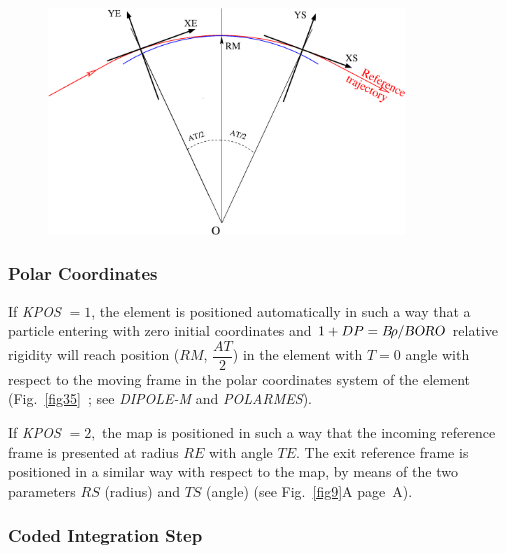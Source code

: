 \begin{figure}[h]
\begin{center}
\vspace{10ex}

\includegraphics[height=6cm]{Fig35.eps}
\end{center}

\vfill
\end{figure}


\medskip





\clearpage 

 \subsubsection*{Polar Coordinates}    
 
 If  \textsl{KPOS} $=1$,  the element is positioned automatically in such a way
that a particle entering with zero initial coordinates and 
$ 1+DP=B\!\rho /\textsl{BORO} $ 
relative rigidity will reach position ($ RM$, $\dfrac{AT }{ 2} $) in 
the element with $ T=0 $ angle with respect to the moving frame in the polar 
coordinates system of the element (Fig.~\ref{fig35}~; 
see \textsl{DIPOLE-M} and \textsl{POLARMES}).

\noindent If  \textsl{KPOS} $=2, $ the map is positioned in such a way that the 
incoming reference frame is presented  at radius $ RE $ with angle $ TE $.  
The exit reference frame  is positioned in a similar way with 
respect to the map,  by means of 
the two parameters $ RS $ (radius) and $ TS $ (angle) (see Fig.~\ref{fig9}A page~\pageref{fig9}A).  






 \subsubsection{Coded Integration Step} 

